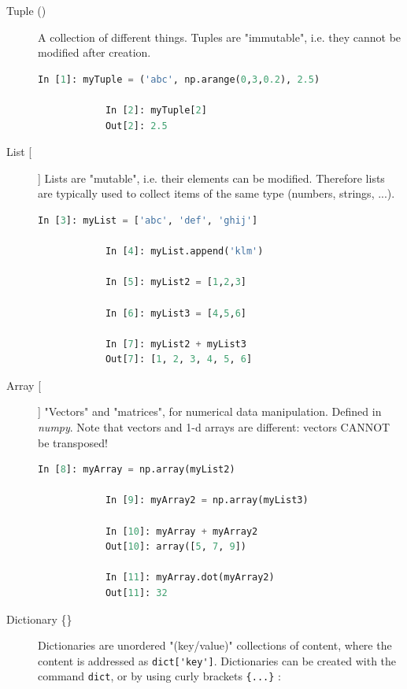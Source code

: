 \begin{description}
  \item[Tuple ()]  A collection of different things. Tuples are "immutable", i.e. they cannot be modified after creation.
      \begin{lstlisting}[language=Python]
            In [1]: myTuple = ('abc', np.arange(0,3,0.2), 2.5)

            In [2]: myTuple[2]
            Out[2]: 2.5
        \end{lstlisting}

  \item[List [] ]  Lists are "mutable", i.e. their elements can be modified. Therefore lists are typically used to collect items of the same type (numbers, strings, ...).
      \begin{lstlisting}[language=Python]
            In [3]: myList = ['abc', 'def', 'ghij']

            In [4]: myList.append('klm')

            In [5]: myList2 = [1,2,3]

            In [6]: myList3 = [4,5,6]

            In [7]: myList2 + myList3
            Out[7]: [1, 2, 3, 4, 5, 6]
        \end{lstlisting}

  \item[Array [] ]  "Vectors" and "matrices", for numerical data manipulation. Defined in \emph{numpy}. Note that vectors and 1-d arrays are different: vectors CANNOT be transposed!
      \begin{lstlisting}[language=Python]
            In [8]: myArray = np.array(myList2)

            In [9]: myArray2 = np.array(myList3)

            In [10]: myArray + myArray2
            Out[10]: array([5, 7, 9])

            In [11]: myArray.dot(myArray2)
            Out[11]: 32
        \end{lstlisting}

  \item[Dictionary \{\}] Dictionaries are unordered "(key/value)" collections of content, where the content is addressed as \lstinline{dict['key']}. Dictionaries can be created with the command \lstinline{dict}, or by using curly brackets \lstinline|{...}| :


\end{description}
